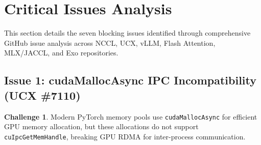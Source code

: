\documentclass[11pt,letterpaper]{article}
\theoremstyle{definition}
\newtheorem{challenge}{Challenge}
\begin{document}
\section{Critical Issues Analysis}

This section details the seven blocking issues identified through comprehensive GitHub issue analysis across NCCL, UCX, vLLM, Flash Attention, MLX/JACCL, and Exo repositories.

\subsection{Issue 1: cudaMallocAsync IPC Incompatibility (UCX \#7110)}

\begin{challenge}
Modern PyTorch memory pools use \texttt{cudaMallocAsync} for efficient GPU memory allocation, but these allocations do not support \texttt{cuIpcGetMemHandle}, breaking GPU RDMA for inter-process communication.
\end{challenge}
\end{document}
